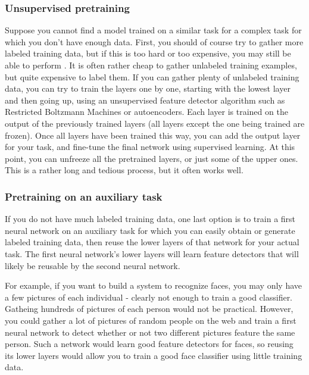 \subsubsection{Unsupervised pretraining}
Suppose you cannot find a model trained on a similar task for a complex task for which you don't have enough data. First, you should of course try to gather more labeled training data, but if this is too hard or too expensive, you may still be able to perform .  It is often rather cheap to gather unlabeled training examples, but quite expensive to label them. If you can gather plenty of unlabeled training data, you can try to train the layers one by one, starting with the lowest layer and then going up, using an unsupervised feature detector algorithm such as Restricted Boltzmann Machines or autoencoders. Each layer is trained on the output of the previously trained layers (all layers except the one being trained are frozen). Once all layers have been trained this way, you can add the output layer for your task, and fine-tune the final network using supervised learning. At this point, you can unfreeze all the pretrained layers, or just some of the upper ones. This is a rather long and tedious process, but it often works well.

\subsubsection{Pretraining on an auxiliary task}
If you do not have much labeled training data, one last option is to train a first neural network on an auxiliary task for which you can easily obtain or generate labeled training data, then reuse the lower layers of that network for your actual task. The first neural network's lower layers will learn feature detectors that will likely be reusable by the second neural network.

For example, if you want to build a system to recognize faces, you may only have a few pictures of each individual - clearly not enough to train a good classifier. Gatheing hundreds of pictures of each person would not be practical. However, you could gather a lot of pictures of random people on the web and train a first neural network to detect whether or not two different pictures feature the same person. Such a network would learn good feature detectors for faces, so reusing its lower layers would allow you to train a good face classifier using little training data.

